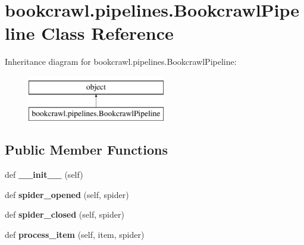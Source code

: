 \hypertarget{classbookcrawl_1_1pipelines_1_1BookcrawlPipeline}{}\section{bookcrawl.\+pipelines.\+Bookcrawl\+Pipeline Class Reference}
\label{classbookcrawl_1_1pipelines_1_1BookcrawlPipeline}
Inheritance diagram for bookcrawl.\+pipelines.\+Bookcrawl\+Pipeline\+:\begin{figure}[H]
\begin{center}
\leavevmode
\includegraphics[height=2.000000cm]{classbookcrawl_1_1pipelines_1_1BookcrawlPipeline}
\end{center}
\end{figure}
\subsection*{Public Member Functions}
\begin{DoxyCompactItemize}
\item 
\hypertarget{classbookcrawl_1_1pipelines_1_1BookcrawlPipeline_ab383d9e621c958cebf999513fb63b0be}{}def {\bfseries \+\_\+\+\_\+init\+\_\+\+\_\+} (self)\label{classbookcrawl_1_1pipelines_1_1BookcrawlPipeline_ab383d9e621c958cebf999513fb63b0be}

\item 
\hypertarget{classbookcrawl_1_1pipelines_1_1BookcrawlPipeline_adca620f961c219e482251a9876067f77}{}def {\bfseries spider\+\_\+opened} (self, spider)\label{classbookcrawl_1_1pipelines_1_1BookcrawlPipeline_adca620f961c219e482251a9876067f77}

\item 
\hypertarget{classbookcrawl_1_1pipelines_1_1BookcrawlPipeline_a8ab0b673efe237450b816dd5ed693691}{}def {\bfseries spider\+\_\+closed} (self, spider)\label{classbookcrawl_1_1pipelines_1_1BookcrawlPipeline_a8ab0b673efe237450b816dd5ed693691}

\item 
\hypertarget{classbookcrawl_1_1pipelines_1_1BookcrawlPipeline_ac00ce6ac454846864e9ad549d1a55c28}{}def {\bfseries process\+\_\+item} (self, item, spider)\label{classbookcrawl_1_1pipelines_1_1BookcrawlPipeline_ac00ce6ac454846864e9ad549d1a55c28}

\end{DoxyCompactItemize}

